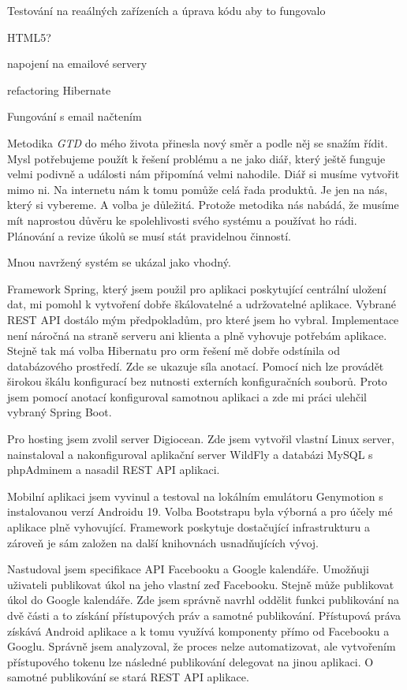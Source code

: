 \documentclass[thesis=B,czech]{FITthesis}[2012/06/26]
\newcommand{\GTD}{\textit{GTD }}
\begin{document}
Testování na reaálných zařízeních a úprava kódu aby to fungovalo

HTML5?

napojení na emailové servery

refactoring Hibernate


Fungování s email načtením


\begin{conclusion}

Metodika \GTD do mého života přinesla nový směr a podle něj se snažím řídit. Mysl potřebujeme použít k řešení problému a ne jako diář, který ještě funguje velmi podivně a události nám připomíná velmi nahodile. Diář si musíme vytvořit mimo ni. Na internetu nám k tomu pomůže celá řada produktů. Je jen na nás, který si vybereme. A volba je důležitá. Protože metodika nás nabádá, že musíme mít naprostou důvěru ke spolehlivosti svého systému a používat ho rádi. Plánování a revize úkolů se musí stát pravidelnou činností.

Mnou navržený systém se ukázal jako vhodný.

Framework Spring, který jsem použil pro aplikaci poskytující centrální uložení dat, mi pomohl k vytvoření dobře škálovatelné a udržovatelné aplikace. Vybrané REST API dostálo mým předpokladům, pro které jsem ho vybral. Implementace není náročná na straně serveru ani klienta a plně vyhovuje potřebám aplikace. Stejně tak má volba Hibernatu pro \acrshort{orm} řešení mě dobře odstínila od databázového prostředí. Zde se ukazuje síla anotací. Pomocí nich lze provádět širokou škálu konfigurací bez nutnosti externích konfiguračních souborů. Proto jsem pomocí anotací konfiguroval  samotnou aplikaci a zde mi práci ulehčil vybraný Spring Boot. 

Pro hosting jsem zvolil server Digiocean. Zde jsem vytvořil vlastní Linux server, nainstaloval a nakonfiguroval aplikační server WildFly a databázi MySQL s phpAdminem a nasadil REST API aplikaci.

Mobilní aplikaci jsem vyvinul a testoval na lokálním emulátoru Genymotion s instalovanou verzí Androidu 19. Volba Bootstrapu byla výborná a pro účely mé aplikace plně vyhovující. Framework poskytuje dostačující infrastrukturu a zároveň je sám založen na další knihovnách usnadňujících vývoj. 

Nastudoval jsem specifikace API Facebooku a Google kalendáře. Umožňuji uživateli publikovat úkol na jeho vlastní zeď Facebooku. Stejně může publikovat úkol do Google kalendáře. Zde jsem správně navrhl oddělit funkci publikování na dvě části a to získání přístupových práv a samotné publikování. Přístupová práva získává Android aplikace a k tomu využívá komponenty přímo od Facebooku a Googlu. Správně jsem analyzoval, že proces nelze automatizovat, ale vytvořením přístupového tokenu lze následné publikování delegovat na jinou aplikaci. O samotné publikování se stará REST API aplikace.


\end{conclusion}
\end{document}
